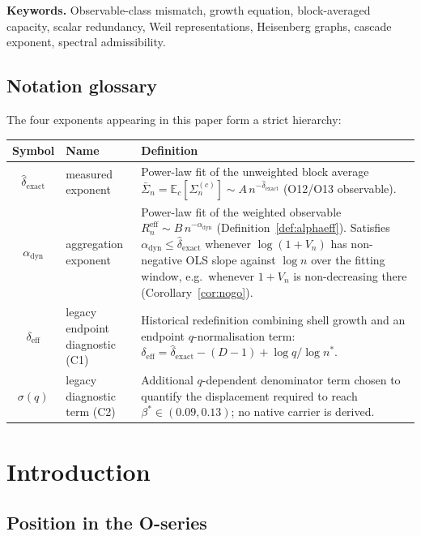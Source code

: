 \documentclass[11pt,a4paper]{article}
\newcommand{\Sn}{\bar{\Sigma}_n}
\newcommand{\dexact}{\hat{\delta}_{\mathrm{exact}}}
\newcommand{\deff}{\delta_{\mathrm{eff}}}
\newcommand{\Reff}{R_n^{\mathrm{eff}}}
\newcommand{\bstar}{\beta^{*}}
\begin{document}
\smallskip\noindent
\textbf{Keywords.}
Observable-class mismatch, growth equation, block-averaged capacity,
scalar redundancy, Weil representations, Heisenberg graphs,
cascade exponent, spectral admissibility.

  \clearpage
\tableofcontents

\clearpage
\subsection*{Notation glossary}

  \noindent
  The four exponents appearing in this paper form a strict hierarchy:
  \begin{center}
    \begin{tabular}{cl>{\raggedright\arraybackslash}p{7.5cm}}
      \toprule
      Symbol & Name & Definition \\
      \midrule
      $\dexact$ & measured exponent &
      Power-law fit of the unweighted block average
      $\Sn = \mathbb{E}_c[\Sigma_n^{(c)}] \sim A\,n^{-\dexact}$
      (O12/O13 observable). \\[4pt]
      $\alpha_{\mathrm{dyn}}$ & aggregation exponent &
      Power-law fit of the weighted observable
      $\Reff \sim B\,n^{-\alpha_{\mathrm{dyn}}}$
      (Definition~\ref{def:alphaeff}).
      Satisfies $\alpha_{\mathrm{dyn}} \leq \dexact$ whenever $\log(1+V_n)$
      has non-negative OLS slope against $\log n$ over the fitting window,
      e.g.\ whenever $1+V_n$ is non-decreasing there
      (Corollary~\ref{cor:nogo}). \\[4pt]
      $\deff$ & legacy endpoint diagnostic (C1) &
      Historical redefinition combining shell growth and an endpoint
      $q$-normalisation term:
      $\deff = \dexact - (D-1) + \log q / \log n^{*}$. \\[4pt]
      $\sigma(q)$ & legacy diagnostic term (C2) &
      Additional $q$-dependent denominator term chosen to quantify the
      displacement required to reach $\bstar \in (0.09, 0.13)$; no native carrier is derived. \\
      \bottomrule
    \end{tabular}
  \end{center}

\section{Introduction}
\label{sec:intro}

\subsection{Position in the O-series}
\label{sec:position}
\end{document}
